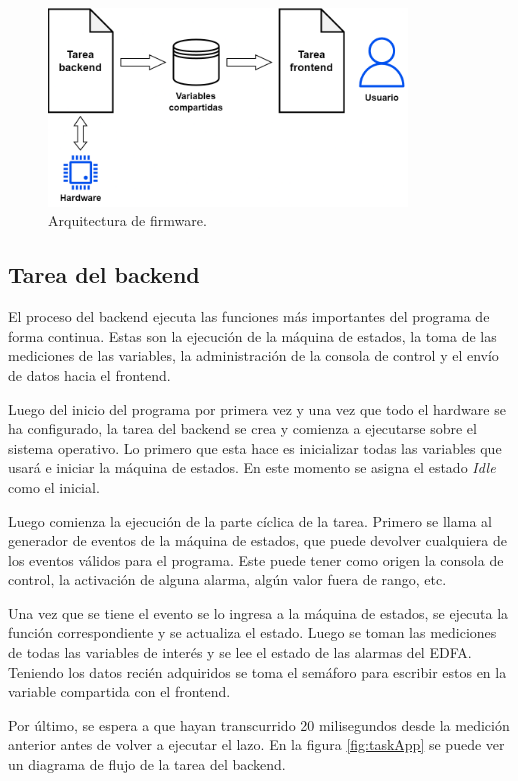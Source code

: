 \begin{figure}[H]
\centering
\includegraphics[width=0.85\textwidth]{./Figures/arqFW.png}
\caption{Arquitectura de firmware.}
\label{fig:arqFW}
\end{figure}

\subsection{Tarea del backend}

El proceso del backend ejecuta las funciones más importantes del programa de forma continua. Estas son la ejecución de la máquina de estados, la toma de las mediciones de las variables, la administración de la consola de control y el envío de datos hacia el frontend. 

Luego del inicio del programa por primera vez y una vez que todo el hardware se ha configurado, la tarea del backend se crea y comienza a ejecutarse sobre el sistema operativo. Lo primero que esta hace es inicializar todas las variables que usará e iniciar la máquina de estados. En este momento se asigna el estado \textit{Idle} como el inicial.

Luego comienza la ejecución de la parte cíclica de la tarea. Primero se llama al generador de eventos de la máquina de estados, que puede devolver cualquiera de los eventos válidos para el programa. Este puede tener como origen la consola de control, la activación de alguna alarma, algún valor fuera de rango, etc.

Una vez que se tiene el evento se lo ingresa a la máquina de estados, se ejecuta la función correspondiente y se actualiza el estado. Luego se toman las mediciones de todas las variables de interés y se lee el estado de las alarmas del EDFA. Teniendo los datos recién adquiridos se toma el semáforo para escribir estos en la variable compartida con el frontend.

Por último, se espera a que hayan transcurrido 20 milisegundos desde la medición anterior antes de volver a ejecutar el lazo. En la figura \ref{fig:taskApp} se puede ver un diagrama de flujo de la tarea del backend.

